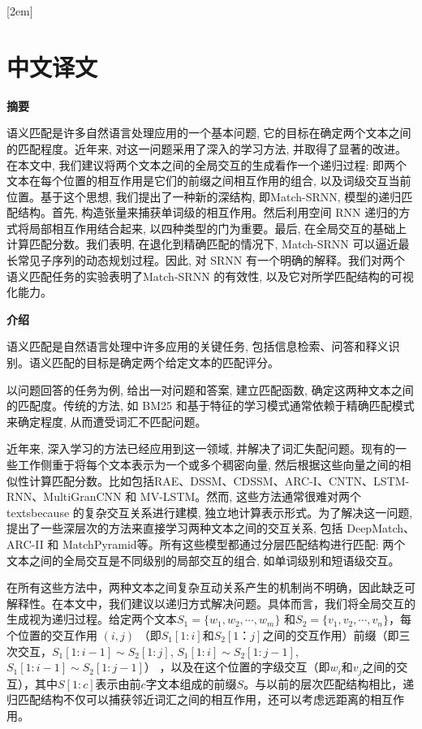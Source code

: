 
[2em]{\vspace{.5\baselineskip}\xiaosan\song}
             {\prechaptername\CJKnumber{\thecontentslabel}\postchaptername\qquad}{}
             {}             %
\setcounter{page}{1}            %
\chapter*{中文译文}
\textbf{摘要}

语义匹配是许多自然语言处理应用的一个基本问题, 它的目标在确定两个文本之间的匹配程度。近年来, 对这一问题采用了深入的学习方法, 并取得了显著的改进。在本文中, 我们建议将两个文本之间的全局交互的生成看作一个递归过程: 即两个文本在每个位置的相互作用是它们的前缀之间相互作用的组合, 以及词级交互当前位置。基于这个思想, 我们提出了一种新的深结构, 即Match-SRNN, 模型的递归匹配结构。首先, 构造张量来捕获单词级的相互作用。然后利用空间 RNN 递归的方式将局部相互作用结合起来, 以四种类型的门为重要。最后, 在全局交互的基础上计算匹配分数。我们表明, 在退化到精确匹配的情况下, Match-SRNN 可以逼近最长常见子序列的动态规划过程。因此, 对 SRNN 有一个明确的解释。我们对两个语义匹配任务的实验表明了Match-SRNN 的有效性, 以及它对所学匹配结构的可视化能力。

\textbf{介绍}

语义匹配是自然语言处理中许多应用的关键任务, 包括信息检索、问答和释义识别。语义匹配的目标是确定两个给定文本的匹配评分。

以问题回答的任务为例, 给出一对问题和答案, 建立匹配函数, 确定这两种文本之间的匹配度。传统的方法, 如 BM25 和基于特征的学习模式通常依赖于精确匹配模式来确定程度, 从而遭受词汇不匹配问题。

近年来, 深入学习的方法已经应用到这一领域, 并解决了词汇失配问题。现有的一些工作侧重于将每个文本表示为一个或多个稠密向量, 然后根据这些向量之间的相似性计算匹配分数。比如包括RAE、DSSM、CDSSM、ARC-I、CNTN、LSTM-RNN、MultiGranCNN 和 MV-LSTM。然而, 这些方法通常很难对两个 textsbecause 的复杂交互关系进行建模, 独立地计算表示形式。为了解决这一问题, 提出了一些深层次的方法来直接学习两种文本之间的交互关系, 包括 DeepMatch、ARC-II 和 MatchPyramid等。所有这些模型都通过分层匹配结构进行匹配: 两个文本之间的全局交互是不同级别的局部交互的组合, 如单词级别和短语级交互。

在所有这些方法中，两种文本之间复杂互动关系产生的机制尚不明确，因此缺乏可解释性。在本文中，我们建议以递归方式解决问题。具体而言，我们将全局交互的生成视为递归过程。给定两个文本$S_1\!\!=\!\!\{w_1,w_2,\cdots,w_m\}$ 和$S_2\!\!=\!\!\{v_1,v_2,\cdots,v_n\}$，每个位置的交互作用 $(i,j)$ （即$S_1[1{:}i]$和$ S_2 [1 {：} j] $之间的交互作用）前缀（即三次交互，$S_1[1{:}i{-}1]\!{\sim}\! S_2[1{:}j]$, $S_1[1{:}i]\!{\sim}\! S_2[1{:}j{-}1]$, $S_1[1{:}i{-}1]{\sim} S_2[1{:}j{-}1]$） ，以及在这个位置的字级交互（即$ w_i $和$ v_j $之间的交互），其中$S[1{:}c]$表示由前$ c $字文本组成的前缀$S$。与以前的层次匹配结构相比，递归匹配结构不仅可以捕获邻近词汇之间的相互作用，还可以考虑远距离的相互作用。

